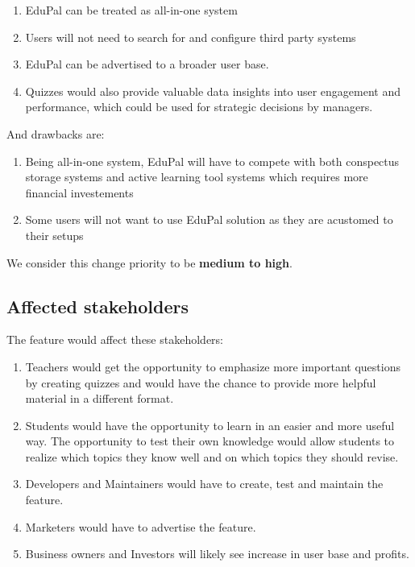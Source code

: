 \documentclass[
    english, %
]{VUMIFPSkursinis}
\begin{document}
\begin{enumerate}
    \item EduPal can be treated as all-in-one system
    \item Users will not need to search for and configure third party systems
    \item EduPal can be advertised to a broader user base.
    \item Quizzes would also provide valuable data insights into user engagement and performance, which could be used for strategic decisions by managers.
\end{enumerate}

And drawbacks are:

\begin{enumerate}
    \item Being all-in-one system, EduPal will have to compete with both conspectus storage systems and active learning tool systems which requires more financial investements
    \item Some users will not want to use EduPal solution as they are acustomed to their setups
\end{enumerate}

We consider this change priority to be \textbf{medium to high}.

\subsection{Affected stakeholders}

The feature would affect these stakeholders:

\begin{enumerate}
    \item Teachers would get the opportunity to emphasize more important questions by creating quizzes and would have the chance to provide more helpful material in a different format.
    \item Students would have the opportunity to learn in an easier and more useful way. The opportunity to test their own knowledge would allow students to realize which topics they know well and on which topics they should revise.
    \item Developers and Maintainers would have to create, test and maintain the feature.
    \item Marketers would have to advertise the feature.
    \item Business owners and Investors will likely see increase in user base and profits.
\end{enumerate}
\end{document}
